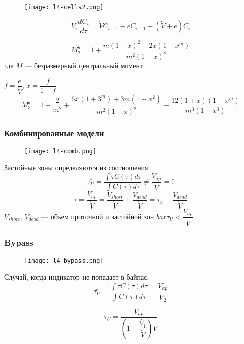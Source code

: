 \begin{frame}
	\begin{figure}[h]
		\texttt{[image: l4-cells2.png]}
	\end{figure}
	\begin{equation}
		V_i \dfrac { dC_i } { d \tau } = \dot {V} C_{i-1} + e C_{ i+1 } -(\dot{V} +e  ) C_i
	\end{equation}

	\begin{equation}
		M_2^\theta=1+\dfrac { m(1-x)^2-2x(1-x^m) } { m^2 (1-x)^2 }
	\end{equation}
	где $M $ --- безразмерный центральный момент
	
	$f=\dfrac {e}{\dot{V}}$, 	$x=\dfrac {f} { 1+f }$
	\begin{equation}
	M_3^\theta=1+\dfrac {2} {m^2} + \dfrac{ 6x(1+3^m)+3m(1-x^2) } { m^2 (1-x)^2 } - \dfrac { 12(1+x)(1-x^m) } { m^3 (1-x^3) }
	\end{equation}
\end{frame}

\begin{frame}
\frametitle{Комбинированные модели}
	\begin{figure}[h]
		\texttt{[image: l4-comb.png]}
	\end{figure}
\end{frame}

\begin{frame}
	Застойные зоны определяются из соотношения:
	\begin{equation}
		\bar{ \tau_U} = \dfrac{ \int \tau C(\tau) d \tau } { \int C(\tau) d \tau }  \neq \dfrac{V_{ap}} {\dot{V}} = \bar{\tau}
	\end{equation}
	\begin{equation}
		\bar{\tau} = \dfrac{V_{ap}} {\dot{V}} = \dfrac {V_{short}} {\dot{ V}}+ \dfrac{V_{dead}} {\dot{V}} = \bar{\tau}_u + \dfrac{V_{dead}} {\dot{V}}
	\end{equation}		
	$V_{short}$, $V_{dead}$ --- объем проточной и застойной зон
	$bar \tau_U < \dfrac {V_{ap}}  {\dot{V}}$

\end{frame}

\begin{frame}
	\frametitle{Bypass}
	\begin{figure}[h]
		\texttt{[image: l4-bypass.png]}
	\end{figure}
	Случай, когда индикатор не попадает в байпас:
	\begin{equation}
		\bar {\tau_U} = \dfrac { \int \tau C(\tau) d \tau }  { \int C(\tau) d \tau }  = \dfrac {V_{ap}} {\dot{V_2}}
	\end{equation}	
	
	\begin{equation}
		\bar{ \tau_U} = \dfrac {V_{ap}} { \left( 1- \dfrac {\dot{V_1}} {\dot V} \right) \dot V }
	\end{equation}
\end{frame}

